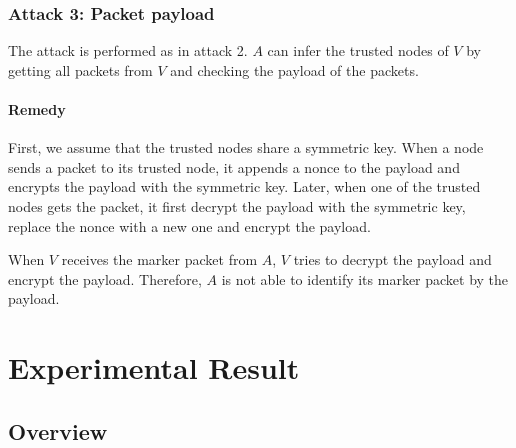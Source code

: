 \documentclass[11pt]{article}
\begin{document}
\subsubsection{Attack 3: Packet payload}
The attack is performed as in attack 2. 
$A$ can infer the trusted nodes of $V$ by getting all packets from $V$ and checking the payload of the packets. 


\paragraph{Remedy}
First, we assume that the trusted nodes share a symmetric key.
When a node sends a packet to its trusted node, it appends a nonce to the payload and encrypts the payload  with the symmetric key. 
Later, when one of the trusted nodes gets the packet, it first decrypt the payload with the symmetric key, replace the nonce with a new one and encrypt the payload. 

When $V$ receives the marker packet from $A$, $V$ tries to decrypt the payload and encrypt the payload.  
Therefore, $A$ is not able to identify its marker packet by the payload.




\section{Experimental Result}
\subsection{Overview}
\end{document}
